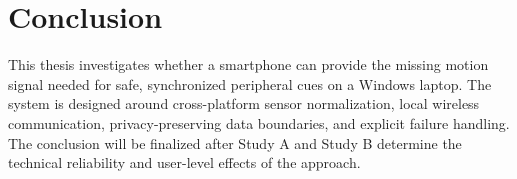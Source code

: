 \section{Conclusion}
\label{sec:conclusion}

This thesis investigates whether a smartphone can provide the missing motion signal needed for safe, synchronized peripheral cues on a Windows laptop. The system is designed around cross-platform sensor normalization, local wireless communication, privacy-preserving data boundaries, and explicit failure handling. The conclusion will be finalized after Study A and Study B determine the technical reliability and user-level effects of the approach.
